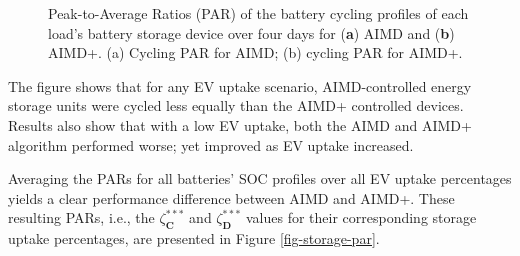 \begin{figure}\centering
 \vspace{-6pt}
 \caption{Peak-to-Average Ratios (PAR) of the battery cycling profiles of each load's battery storage device over four days for (\textbf{a}) AIMD  and (\textbf{b}) AIMD+. ({a}) Cycling PAR for AIMD; ({b}) cycling PAR for AIMD+.}
 \label{fig-storage-par-large}
\end{figure}

The figure shows that for any EV uptake scenario, AIMD-controlled energy storage units were cycled less equally than the AIMD+ controlled devices. Results also show that with a low EV uptake, both the AIMD and AIMD+ algorithm performed worse; yet improved as EV uptake increased.

Averaging the PARs for all batteries' SOC profiles over all EV uptake percentages yields a clear performance difference between AIMD and AIMD+. These resulting PARs, i.e., the $\zeta_\textbf{C}^{***}$ and $\zeta_\textbf{D}^{***}$ values for their corresponding storage uptake percentages, are presented in Figure \ref{fig-storage-par}.

